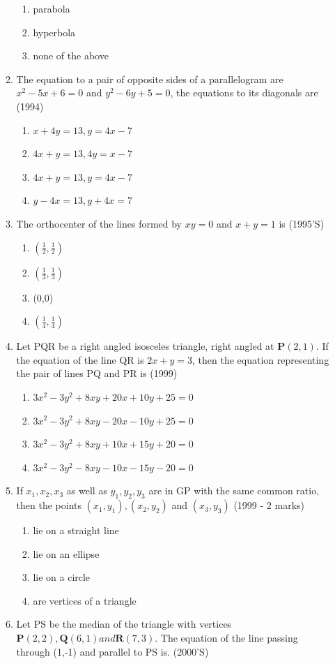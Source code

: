 \documentclass[12pt]{article}
\providecommand{\brak}[1]{\ensuremath{\left(#1\right)}}
\let\vec\mathbf
\begin{document}
\begin{enumerate}
\begin{enumerate}
\begin{enumerate}
\item parabola  
\item hyperbola  
\item none of the above
\end{enumerate}
\item The equation to a pair of  opposite sides of a parallelogram are $x^2-5x+6=0$ and $y^2-6y+5=0$, the equations to its diagonals are (1994)
\begin{enumerate}
\item $x+4y=13, y=4x-7$  
\item $4x+y=13, 4y=x-7$ 
\item $4x+y=13, y=4x-7$
\item $y-4x=13,y+4x=7$ 
\end{enumerate}
\item The orthocenter of the lines formed by $xy=0$ and $x+y=1$ is (1995'S)
\begin{enumerate}
\item $\brak{\frac{1}{2},\frac{1}{2}}$
\item $\brak{\frac{1}{3},\frac{1}{3}}$
\item (0,0)
\item $\brak{\frac{1}{4},\frac{1}{4}}$
\end{enumerate}
\item Let PQR be a right angled isosceles triangle, right angled at $\vec{P}(2,1)$. If the equation of the line QR is $2x+y=3$, then the equation representing the pair of lines PQ and PR is (1999)
\begin{enumerate}
\item $3x^2-3y^2+8xy+20x+10y+25=0$
\item $3x^2-3y^2+8xy-20x-10y+25=0$
\item $3x^2-3y^2+8xy+10x+15y+20=0$
\item $3x^2-3y^2-8xy-10x-15y-20=0$
\end{enumerate}
\item If $x_1,x_2,x_3$ as well as $y_1,y_2,y_3 $ are in GP with the same common ratio, then the points $(x_1,y_1),(x_2,y_2)$ and $(x_3,y_3)$ (1999 - 2 marks)
\begin{enumerate}
\item lie on a straight line 
\item lie on an ellipse 
\item lie on a circle  
\item are vertices of a triangle 
\end{enumerate}
\item Let PS be the median of the triangle with vertices $\vec{P}(2,2), \vec{Q}(6,1) and \vec{R}(7,3)$. The equation of the line passing through (1,-1) and parallel to PS is. (2000'S)

\end{enumerate}
\end{enumerate}
\end{document}
